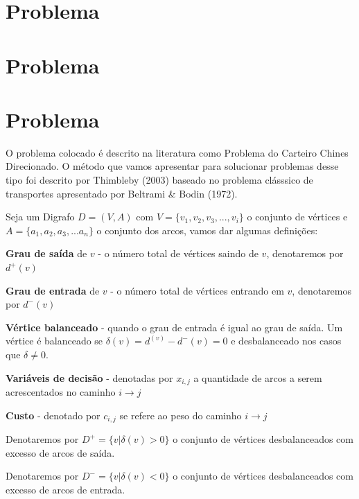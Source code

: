 \documentclass[a4paper, 12pt]{article}
\begin{document}
 
	
	
	
	\section{Problema}
	
	\section{Problema}
	
	\newpage
	
	\section{Problema}
	
	O problema colocado é descrito na literatura como Problema do Carteiro Chines Direcionado. O método que vamos apresentar para solucionar problemas desse tipo foi descrito por Thimbleby (2003) baseado no problema clásssico de transportes apresentado por Beltrami \& Bodin (1972).
	
	Seja um Digrafo $D=(V,A)$ com $V=\{v_1,v_2,v_3,...,v_i\}$ o conjunto de vértices e $A=\{a_1,a_2,a_3,...a_n\}$ o conjunto dos arcos, vamos dar algumas definições:
	
	\textbf{Grau de saída} de $v$ - o número total de vértices saindo de $v$, denotaremos por $d^+(v)$
	 
	\textbf{Grau de entrada} de $v$ - o número total de vértices entrando em $v$, denotaremos por $d^-(v)$
	
	\textbf{Vértice balanceado} - quando o grau de entrada é igual ao grau de saída. Um vértice é balanceado se $\delta(v)=d^(v)-d^-(v)=0$ e desbalanceado nos casos que $\delta \neq 0$.
	
	\textbf{Variáveis de decisão} - denotadas por $x_{i,j}$ a quantidade de arcos a serem acrescentados no caminho $i \rightarrow j$
	
	\textbf{Custo} - denotado por $c_{i,j}$ se refere ao peso do caminho $i\rightarrow j$
	

	Denotaremos por $D^+=\{v| \delta(v) > 0\}$ o conjunto de vértices desbalanceados com excesso de arcos de saída.
	
	Denotaremos por $D^-=\{v| \delta(v) < 0\}$ o conjunto de vértices desbalanceados com excesso de arcos de entrada.
	 
\end{document}
